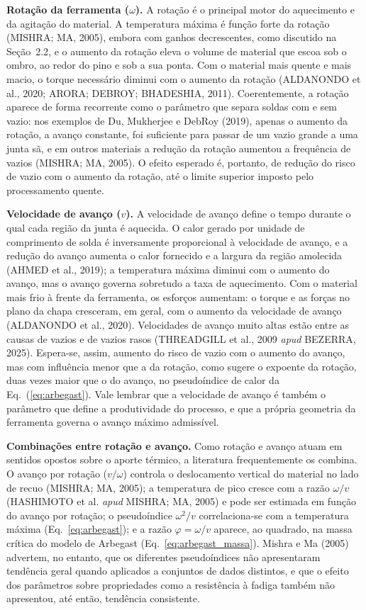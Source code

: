\documentclass[12pt,openany]{report}
\begin{document}
\textbf{Rotação da ferramenta ($\omega$).} A rotação é o principal motor do aquecimento e da agitação do material. A temperatura máxima é função forte da rotação (MISHRA; MA, 2005), embora com ganhos decrescentes, como discutido na Seção~2.2, e o aumento da rotação eleva o volume de material que escoa sob o ombro, ao redor do pino e sob a sua ponta. Com o material mais quente e mais macio, o torque necessário diminui com o aumento da rotação (ALDANONDO et al., 2020; ARORA; DEBROY; BHADESHIA, 2011). Coerentemente, a rotação aparece de forma recorrente como o parâmetro que separa soldas com e sem vazio: nos exemplos de Du, Mukherjee e DebRoy (2019), apenas o aumento da rotação, a avanço constante, foi suficiente para passar de um vazio grande a uma junta sã, e em outros materiais a redução da rotação aumentou a frequência de vazios (MISHRA; MA, 2005). O efeito esperado é, portanto, de redução do risco de vazio com o aumento da rotação, até o limite superior imposto pelo processamento quente.

\textbf{Velocidade de avanço ($v$).} A velocidade de avanço define o tempo durante o qual cada região da junta é aquecida. O calor gerado por unidade de comprimento de solda é inversamente proporcional à velocidade de avanço, e a redução do avanço aumenta o calor fornecido e a largura da região amolecida (AHMED et al., 2019); a temperatura máxima diminui com o aumento do avanço, mas o avanço governa sobretudo a taxa de aquecimento. Com o material mais frio à frente da ferramenta, os esforços aumentam: o torque e as forças no plano da chapa cresceram, em geral, com o aumento da velocidade de avanço (ALDANONDO et al., 2020). Velocidades de avanço muito altas estão entre as causas de vazios e de vazios rasos (THREADGILL et al., 2009 \textit{apud} BEZERRA, 2025). Espera-se, assim, aumento do risco de vazio com o aumento do avanço, mas com influência menor que a da rotação, como sugere o expoente da rotação, duas vezes maior que o do avanço, no pseudoíndice de calor da Eq.~(\ref{eq:arbegast}). Vale lembrar que a velocidade de avanço é também o parâmetro que define a produtividade do processo, e que a própria geometria da ferramenta governa o avanço máximo admissível.

\textbf{Combinações entre rotação e avanço.} Como rotação e avanço atuam em sentidos opostos sobre o aporte térmico, a literatura frequentemente os combina. O avanço por rotação ($v/\omega$) controla o deslocamento vertical do material no lado de recuo (MISHRA; MA, 2005); a temperatura de pico cresce com a razão $\omega/v$ (HASHIMOTO et al. \textit{apud} MISHRA; MA, 2005) e pode ser estimada em função do avanço por rotação; o pseudoíndice $\omega^{2}/v$ correlaciona-se com a temperatura máxima (Eq.~\ref{eq:arbegast}); e a razão $\varphi = \omega/v$ aparece, ao quadrado, na massa crítica do modelo de Arbegast (Eq.~\ref{eq:arbegast_massa}). Mishra e Ma (2005) advertem, no entanto, que os diferentes pseudoíndices não apresentaram tendência geral quando aplicados a conjuntos de dados distintos, e que o efeito dos parâmetros sobre propriedades como a resistência à fadiga também não apresentou, até então, tendência consistente.
\end{document}
